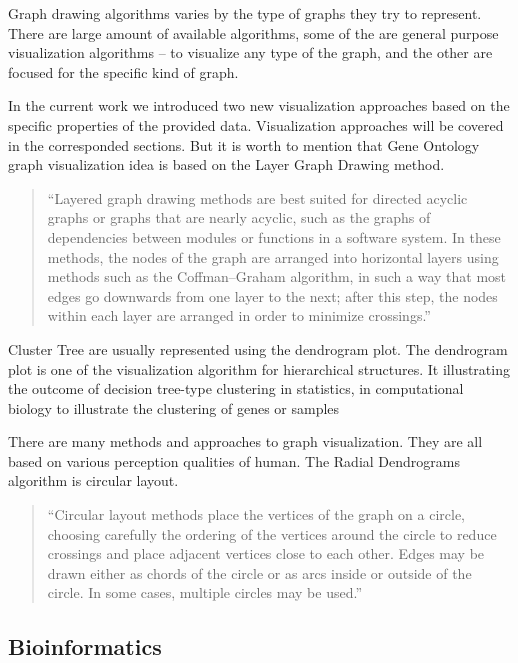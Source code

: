 Graph drawing algorithms varies by the type of graphs they try to represent. There are large amount of available algorithms, some of the are general purpose visualization algorithms -- to visualize any type of the graph, and the other are focused for the specific kind of graph.

In the current work we introduced two new visualization approaches based on the specific properties of the provided data. Visualization approaches will be covered in the corresponded sections. But it is worth to mention that Gene Ontology graph visualization idea is based on the Layer Graph Drawing method.

\begin{quotation}
``Layered graph drawing methods are best suited for directed acyclic graphs or graphs that are nearly acyclic, such as the graphs of dependencies between modules or functions in a software system. In these methods, the nodes of the graph are arranged into horizontal layers using methods such as the Coffman–Graham algorithm, in such a way that most edges go downwards from one layer to the next; after this step, the nodes within each layer are arranged in order to minimize crossings.''~\cite{Layered_graph_drawing}
\end{quotation}


Cluster Tree are usually represented using the dendrogram plot. The dendrogram plot is one of the visualization algorithm for hierarchical structures. It illustrating the outcome of decision tree-type clustering in statistics, in computational biology to illustrate the clustering of genes or samples~\cite{Dendrogram}

There are many methods and approaches to graph visualization. They are all based on various perception qualities of human.
The Radial Dendrograms~\cite{Radial_dendrogram} algorithm is circular layout.

\begin{quotation}
``Circular layout methods place the vertices of the graph on a circle, choosing carefully the ordering of the vertices around the circle to reduce crossings and place adjacent vertices close to each other. Edges may be drawn either as chords of the circle or as arcs inside or outside of the circle. In some cases, multiple circles may be used.''~\cite{Circular_layout}
\end{quotation}



\subsection{Bioinformatics}
\label{sec:bioinformatics}

